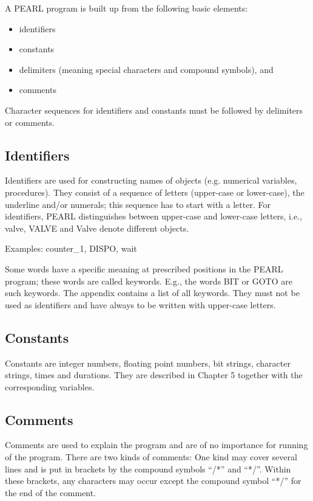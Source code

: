 A PEARL program is built up from the following basic elements:

\begin{itemize}
\item identifiers
\item constants
\item delimiters (meaning special characters and compound symbols), and
\item comments
\end{itemize}

Character sequences for identifiers and constants must be followed by
delimiters or comments.

\subsection{Identifiers}   %

Identifiers are used for constructing names of objects (e.g. numerical
variables, procedures). They consist of a sequence of letters
(upper-case or lower-case), the underline and/or numerals; this sequence
has to start with a letter. For identifiers, PEARL distinguishes between
upper-case and lower-case letters, i.e., valve, VALVE and Valve denote
different objects.

Examples: counter\_1, DISPO, wait

Some words have a specific meaning at prescribed positions in the PEARL
program; these words are called keywords. E.g., the words BIT or GOTO
are such keywords. The appendix contains a list of all keywords. They
must not be used as identifiers and have always to be written with
upper-case letters.

\subsection{Constants}   %

Constants are integer numbers, floating point numbers, bit strings,
character strings, times and durations. They are described in Chapter 5
together with the corresponding variables.

\subsection{Comments}    %

Comments are used to explain the program and are of no importance for
running of the program. There are two kinds of comments: One kind may
cover several lines and is put in brackets by the compound symbols ``/*''
and ``*/''. Within these brackets, any characters may occur except the
compound symbol ``*/'' for the end of the comment.


